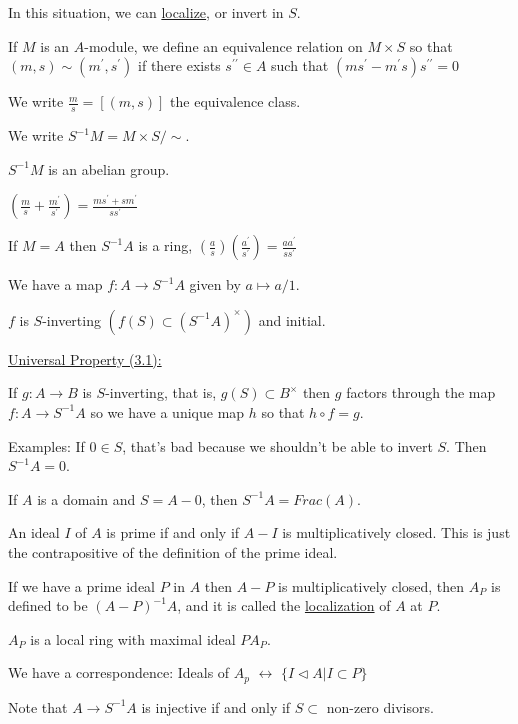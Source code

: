 \documentclass{article}
\theoremstyle{definition}
\begin{document}
In this situation, we can \underline{localize}, or invert in \(S\).

If \(M\) is an \(A\)-module, we define an equivalence relation on \(M \times S\) so that \((m,s)\sim (m^{\prime} ,s^{\prime} )\) if there exists \(s^{\prime\prime} \in A\) such that \((ms^{\prime} - m^{\prime} s)s^{\prime\prime} = 0\) 

We write \(\frac{m}{s} = [(m,s)]\) the equivalence class.

We write \(S ^{-1} M = M \times S / \sim\).

\(S ^{-1} M\) is an abelian group.

\(\left( \frac{m}{s} + \frac{m^{\prime}}{s^{\prime}}  \right) = \frac{ms^{\prime} +sm^{\prime} }{ss^{\prime} }\) 

If \(M = A\) then \(S ^{-1} A\) is a ring, \(\left( \frac{a}{s} \right) \left( \frac{a^{\prime} }{s^{\prime} } \right) = \frac{a a ^{\prime} }{s s^{\prime} }\) 

We have a map \(f: A \to S ^{-1} A\) given by \(a \mapsto a / 1\).

\(f\) is \(S\)-inverting \((f(S) \subset (S ^{-1} A)^\times )\) and initial.

\underline{Universal Property (3.1):}

If \(g: A \to B\) is \(S\)-inverting, that is, \(g(S) \subset B^\times \) then \(g\) factors through the map \(f: A \to S ^{-1} A\) so we have a unique map \(h\) so that \(h\circ f=g\).

Examples: If \(0\in S\), that's bad because we shouldn't be able to invert \(S\). Then \(S ^{-1} A = 0\).

If \(A\) is a domain and \(S = A - 0 \), then \(S ^{-1} A = Frac(A)\).

An ideal \(I\) of \(A\)  is prime if and only if \(A - I\) is multiplicatively closed. This is just the contrapositive of the definition of the prime ideal.

If we have a prime ideal \(P\) in \(A\) then \(A - P\) is multiplicatively closed, then \(A_P\) is defined to be \((A - P)^{-1} A\), and it is called the \underline{localization} of \(A\) at \(P\).

\(A_P\) is a local ring with maximal ideal \(PA_P\).

We have a correspondence: Ideals of \(A_p\) \(\leftrightarrow\) \(\{ I \triangleleft A | I \subset P \} \) 

Note that \(A \to S ^{-1} A\) is injective if and only if \(S \subset \) non-zero divisors.
\end{document}
